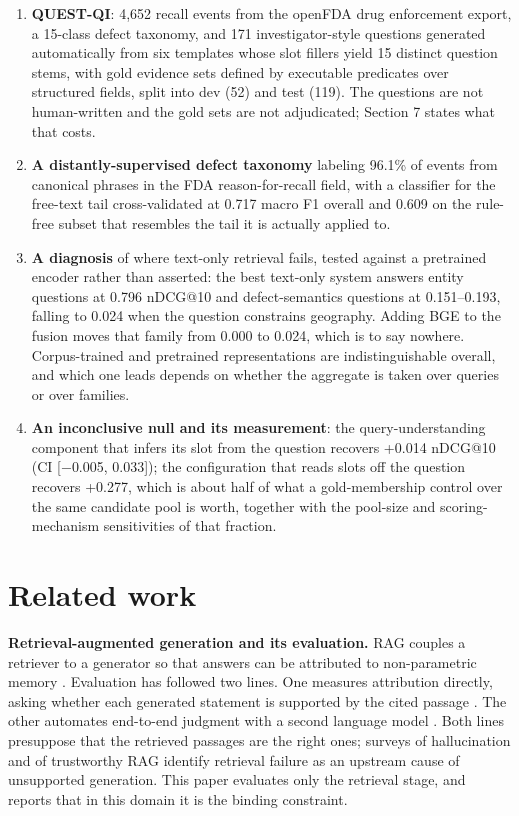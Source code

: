 \documentclass[acmsmall]{acmart}
\begin{document}
\begin{enumerate}
\item \textbf{QUEST-QI}: 4,652 recall events from the openFDA drug enforcement export, a 15-class defect taxonomy, and 171 investigator-style questions generated automatically from six templates whose slot fillers yield 15 distinct question stems, with gold evidence sets defined by executable predicates over structured fields, split into dev (52) and test (119). The questions are not human-written and the gold sets are not adjudicated; Section 7 states what that costs.
\item \textbf{A distantly-supervised defect taxonomy} labeling 96.1\% of events from canonical phrases in the FDA reason-for-recall field, with a classifier for the free-text tail cross-validated at 0.717 macro F1 overall and 0.609 on the rule-free subset that resembles the tail it is actually applied to.
\item \textbf{A diagnosis} of where text-only retrieval fails, tested against a pretrained encoder rather than asserted: the best text-only system answers entity questions at 0.796 nDCG@10 and defect-semantics questions at 0.151--0.193, falling to 0.024 when the question constrains geography. Adding BGE to the fusion moves that family from 0.000 to 0.024, which is to say nowhere. Corpus-trained and pretrained representations are indistinguishable overall, and which one leads depends on whether the aggregate is taken over queries or over families.
\item \textbf{An inconclusive null and its measurement}: the query-understanding component that infers its slot from the question recovers +0.014 nDCG@10 (CI [$-$0.005, 0.033]); the configuration that reads slots off the question recovers +0.277, which is about half of what a gold-membership control over the same candidate pool is worth, together with the pool-size and scoring-mechanism sensitivities of that fraction.
\end{enumerate}


\section{Related work}
\textbf{Retrieval-augmented generation and its evaluation.} RAG couples a retriever to a generator so that answers can be attributed to non-parametric memory \cite{lewis2020rag,gao2023ragsurvey}. Evaluation has followed two lines. One measures attribution directly, asking whether each generated statement is supported by the cited passage \cite{rashkin2021attribution,bohnet2022aqa,gao2023alce,min2023factscore}. The other automates end-to-end judgment with a second language model \cite{es2023ragas,saadfalcon2023ares,zheng2023llmjudge}. Both lines presuppose that the retrieved passages are the right ones; surveys of hallucination \cite{ji2022hallucination} and of trustworthy RAG \cite{ni2025trustworthyrag} identify retrieval failure as an upstream cause of unsupported generation. This paper evaluates only the retrieval stage, and reports that in this domain it is the binding constraint.
\end{document}
